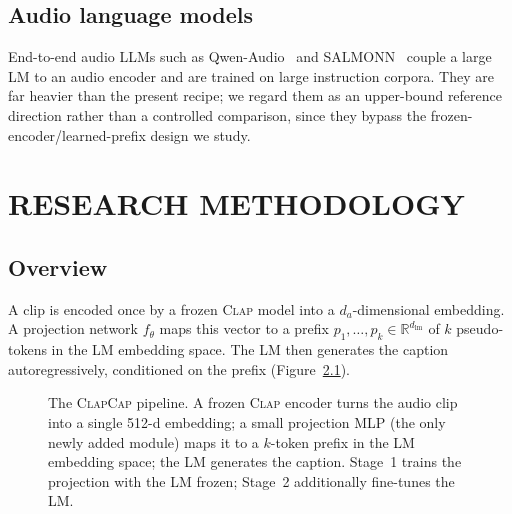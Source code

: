 \documentclass[9pt]{report}
\newcommand{\clapenc}{\textsc{Clap}}
\newcommand{\sys}{\textsc{ClapCap}}
\begin{document}
\section{Audio language models}
End-to-end audio LLMs such as Qwen-Audio~\cite{chu2023qwenaudio} and
SALMONN~\cite{tang2024salmonn} couple a large LM to an audio encoder and are trained on large
instruction corpora. They are far heavier than the present recipe; we regard them as an
upper-bound reference direction rather than a controlled comparison, since they bypass the
frozen-encoder/learned-prefix design we study.

\chapter{RESEARCH METHODOLOGY}\label{ch:method}

\section{Overview}
A clip is encoded once by a frozen \clapenc{} model into a $d_a$-dimensional embedding. A
projection network $f_\theta$ maps this vector to a prefix
$p_1,\dots,p_k \in \mathbb{R}^{d_{\text{lm}}}$ of $k$ pseudo-tokens in the LM embedding space.
The LM then generates the caption autoregressively, conditioned on the prefix
(Figure~\ref{fig:pipeline}).

\begin{figure}[htbp]\centering
\footnotesize
{}
\caption{The \sys{} pipeline. A frozen \clapenc{} encoder turns the audio clip into a single
512-d embedding; a small projection MLP (the only newly added module) maps it to a $k$-token
prefix in the LM embedding space; the LM generates the caption. Stage~1 trains the projection
with the LM frozen; Stage~2 additionally fine-tunes the LM.}
\label{fig:pipeline}
\end{figure}
\end{document}
